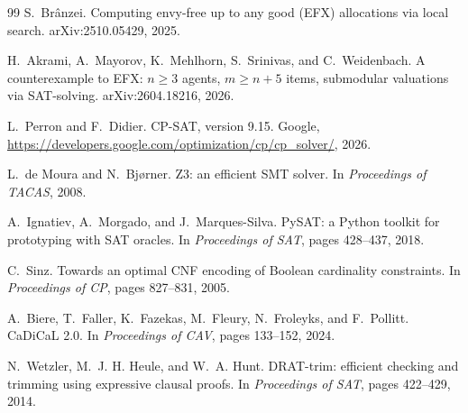 \documentclass[11pt]{article}
\theoremstyle{plain}
\theoremstyle{definition}
\begin{document}
\begin{thebibliography}{99}
S.~Br\^anzei.
\newblock Computing envy-free up to any good (EFX) allocations via local search.
\newblock arXiv:2510.05429, 2025.

H.~Akrami, A.~Mayorov, K.~Mehlhorn, S.~Srinivas, and C.~Weidenbach.
\newblock A counterexample to EFX: $n\ge3$ agents, $m\ge n+5$ items,
submodular valuations via SAT-solving.
\newblock arXiv:2604.18216, 2026.

L.~Perron and F.~Didier.
\newblock CP-SAT, version 9.15.
\newblock Google, \url{https://developers.google.com/optimization/cp/cp_solver/},
2026.

L.~de Moura and N.~Bj{\o}rner.
\newblock Z3: an efficient SMT solver.
\newblock In \emph{Proceedings of TACAS}, 2008.

A.~Ignatiev, A.~Morgado, and J.~Marques-Silva.
\newblock PySAT: a Python toolkit for prototyping with SAT oracles.
\newblock In \emph{Proceedings of SAT}, pages 428--437, 2018.

C.~Sinz.
\newblock Towards an optimal CNF encoding of Boolean cardinality constraints.
\newblock In \emph{Proceedings of CP}, pages 827--831, 2005.

A.~Biere, T.~Faller, K.~Fazekas, M.~Fleury, N.~Froleyks, and F.~Pollitt.
\newblock CaDiCaL 2.0.
\newblock In \emph{Proceedings of CAV}, pages 133--152, 2024.

N.~Wetzler, M.~J. H. Heule, and W.~A. Hunt.
\newblock DRAT-trim: efficient checking and trimming using expressive clausal
proofs.
\newblock In \emph{Proceedings of SAT}, pages 422--429, 2014.

\end{thebibliography}
\end{document}
